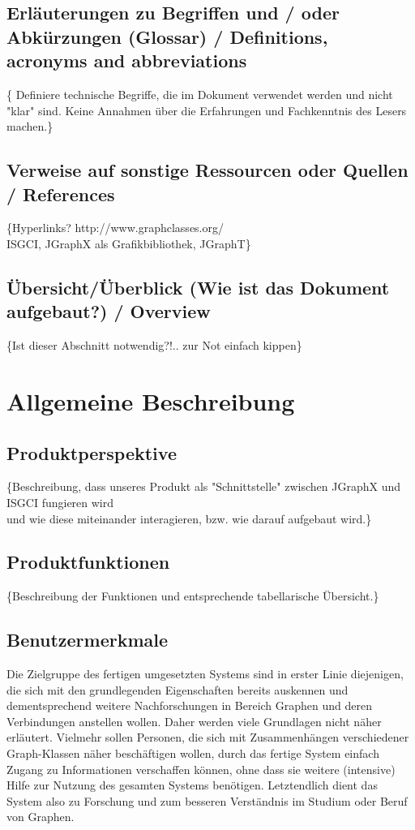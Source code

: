 \documentclass[11pt,a4paper]{article}
\begin{document}
  	\subsection{Erläuterungen zu Begriffen und / oder Abkürzungen (Glossar) / Definitions, acronyms and abbreviations} %
	\{        Definiere technische Begriffe, die im Dokument verwendet werden und nicht "klar" sind.
	        Keine Annahmen über die Erfahrungen und Fachkenntnis des Lesers machen.\}
  	\subsection{Verweise auf sonstige Ressourcen oder Quellen / References} %
  	\{Hyperlinks? http://www.graphclasses.org/\\
          ISGCI, JGraphX als Grafikbibliothek, JGraphT\}
  	\subsection{Übersicht/Überblick (Wie ist das Dokument aufgebaut?) / Overview} %
  	\{Ist dieser Abschnitt notwendig?!.. zur Not einfach kippen\}
  	
\newpage
\section{Allgemeine Beschreibung} %
  	\subsection{Produktperspektive} %
	\{Beschreibung, dass unseres Produkt als "Schnittstelle" zwischen JGraphX und ISGCI fungieren wird\\
	und wie diese miteinander interagieren, bzw. wie darauf aufgebaut wird.\}
  	\subsection{Produktfunktionen} %
	\{Beschreibung der Funktionen und entsprechende tabellarische Übersicht.\}     
    \subsection{Benutzermerkmale} %
	Die Zielgruppe des fertigen umgesetzten Systems sind in erster Linie diejenigen, die sich mit den grundlegenden Eigenschaften bereits auskennen und dementsprechend weitere Nachforschungen in Bereich Graphen und deren Verbindungen anstellen wollen. Daher werden viele Grundlagen nicht näher erläutert. Vielmehr sollen Personen, die sich mit Zusammenhängen verschiedener Graph-Klassen näher beschäftigen wollen, durch das fertige System einfach Zugang zu Informationen verschaffen können, ohne dass sie weitere (intensive) Hilfe zur Nutzung des gesamten Systems benötigen.
	Letztendlich dient das System also zu Forschung und zum besseren Verständnis im Studium oder Beruf von Graphen.
\end{document}
